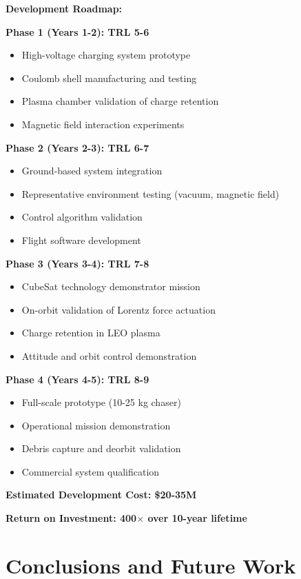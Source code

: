 \documentclass[12pt,a4paper]{article}
\begin{document}
\textbf{Development Roadmap:}

\textbf{Phase 1 (Years 1-2): TRL 5-6}
\begin{itemize}
\item High-voltage charging system prototype
\item Coulomb shell manufacturing and testing
\item Plasma chamber validation of charge retention
\item Magnetic field interaction experiments
\end{itemize}

\textbf{Phase 2 (Years 2-3): TRL 6-7}
\begin{itemize}
\item Ground-based system integration
\item Representative environment testing (vacuum, magnetic field)
\item Control algorithm validation
\item Flight software development
\end{itemize}

\textbf{Phase 3 (Years 3-4): TRL 7-8}
\begin{itemize}
\item CubeSat technology demonstrator mission
\item On-orbit validation of Lorentz force actuation
\item Charge retention in LEO plasma
\item Attitude and orbit control demonstration
\end{itemize}

\textbf{Phase 4 (Years 4-5): TRL 8-9}
\begin{itemize}
\item Full-scale prototype (10-25 kg chaser)
\item Operational mission demonstration
\item Debris capture and deorbit validation
\item Commercial system qualification
\end{itemize}

\textbf{Estimated Development Cost: \$20-35M}

\textbf{Return on Investment: 400$\times$ over 10-year lifetime}

\section{Conclusions and Future Work}
\end{document}
